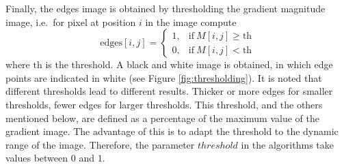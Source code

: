 \documentclass{ipol}
\numberwithin{equation}{section}
\numberwithin{table}{section}
\begin{document}
{Finally, the edges image is obtained by thresholding the gradient magnitude image, i.e.\ for pixel at position $i$ in the image compute
\begin{equation*}
	\mbox{edges}[i,j] = \begin{cases} 1,& \mbox{if}\ M[i,j]\geq\mbox{th} \\
									0,& \mbox{if}\ M[i,j]<\mbox{th}
					  \end{cases}
\end{equation*}
where $\mbox{th}$ is the threshold. A black and white image is obtained, in which edge points are indicated in white (see Figure \ref{fig:thresholding}). 
It is noted that different thresholds lead to different results. Thicker or more edges for smaller thresholds, fewer edges 
for larger thresholds. This threshold, and the others mentioned below, are defined as a percentage of the maximum value 
of the gradient image. The advantage of this is to adapt the threshold to the dynamic range of the image. 
Therefore, the parameter $threshold$ in the algorithms take values ​​between $0$ and $1$.


\begin{figure}[t!]
	\centering
	

\end{figure}}
\end{document}
